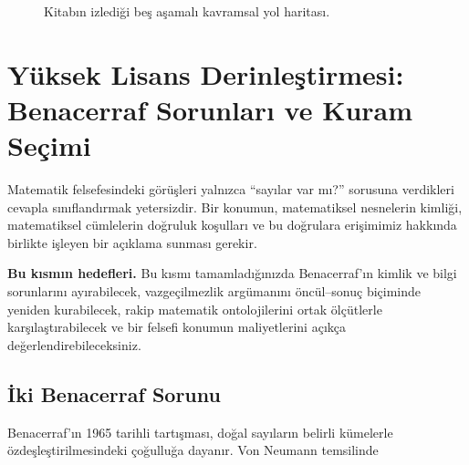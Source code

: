 \begin{figure}[htbp]
\centering
{}
\caption{Kitabın izlediği beş aşamalı kavramsal yol haritası.}
\end{figure}

\section{Yüksek Lisans Derinleştirmesi: Benacerraf Sorunları ve Kuram Seçimi}

Matematik felsefesindeki görüşleri yalnızca “sayılar var mı?” sorusuna verdikleri cevapla sınıflandırmak yetersizdir. Bir konumun, matematiksel nesnelerin kimliği, matematiksel cümlelerin doğruluk koşulları ve bu doğrulara erişimimiz hakkında birlikte işleyen bir açıklama sunması gerekir.

\textbf{Bu kısmın hedefleri.} Bu kısmı tamamladığınızda Benacerraf’ın kimlik ve bilgi sorunlarını ayırabilecek, vazgeçilmezlik argümanını öncül–sonuç biçiminde yeniden kurabilecek, rakip matematik ontolojilerini ortak ölçütlerle karşılaştırabilecek ve bir felsefi konumun maliyetlerini açıkça değerlendirebileceksiniz.

\subsection{İki Benacerraf Sorunu}
Benacerraf’ın 1965 tarihli tartışması, doğal sayıların belirli kümelerle özdeşleştirilmesindeki çoğulluğa dayanır. Von Neumann temsilinde


